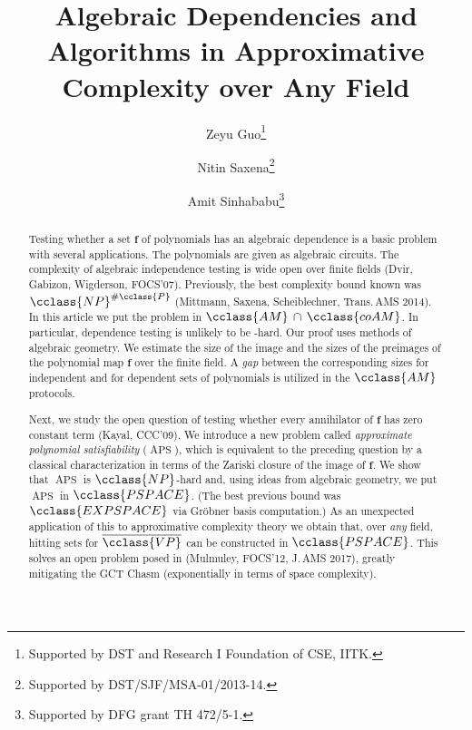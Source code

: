 \documentclass{toc}
\newcommand{\Pclass}{\cclass{P}\xspace}  %
\newcommand{\NP}{\cclass{NP}\xspace}  %
\newcommand{\AM}{\cclass{AM}\xspace}  %
\newcommand{\coAM}{\cclass{coAM}\xspace}  %
\newcommand{\AMcapcoAM}{\AM\,\cap\,\coAM}  %
\newcommand{\PSPACE}{\cclass{PSPACE}\xspace}  %
\newcommand{\EXPSPACE}{\cclass{EXPSPACE}\xspace} %
\newcommand{\VP}{\cclass{VP}\xspace}  %
\newcommand{\VPbar}{\overline{\VP}\xspace}  %
\DeclareMathOperator{\APS}{\mathrm{APS}\xspace} %
\begin{document}
\begin{frontmatter}
%
%

%
 \title{Algebraic Dependencies and \PSPACE Algorithms in Approximative Complexity over Any Field}
%
%
%
%
%
%
%
%
%
%
%
%


%
%
%
\author[guo]{Zeyu Guo\thanks{Supported by  DST and Research I Foundation of CSE, IITK.}}
\author[saxena]{Nitin Saxena\thanks{Supported by DST/SJF/MSA-01/2013-14.}}
\author[sinhababu]{Amit Sinhababu\thanks{Supported by DFG grant TH 472/5-1.}}  %

%
%
%
%

%
\begin{abstract}
  Testing whether a set $\mathbf{f}$ of polynomials has an algebraic dependence is a basic problem with several applications. The polynomials are given as algebraic circuits.
%
The complexity of algebraic independence testing  %
is wide open over finite fields (Dvir, Gabizon, Wigderson, FOCS'07).
Previously, the best complexity
bound  %
known was
%
$\NP^{\#\Pclass}$  %
(Mittmann, Saxena, Scheiblechner,
%
Trans.\,AMS 2014).  %
In this
%
article  %
we put the problem in
%
$\AMcapcoAM$.
In particular, dependence testing is unlikely to be
%
\NP-hard.  %
Our proof 
%
uses methods of algebraic geometry.  We estimate  %
%
the size of the image and the sizes of the preimages  %
of the polynomial map $\mathbf{f}$ over the finite field.
A \emph{gap} between %
the corresponding sizes  %
for independent and for dependent sets of polynomials %
%
is utilized in the $\AM$ protocols.  %

Next, we study the open question of testing whether every annihilator of $\mathbf{f}$ has zero constant term (Kayal, CCC'09). We introduce a new problem called \emph{approximate polynomial satisfiability} ($\APS$), which is equivalent to the preceding question by a classical characterization in terms of the Zariski closure of the image of $\mathbf{f}$.
We show that $\APS$ is $\NP$-hard and, using
%
ideas from algebraic geometry, %
we put $\APS$ in 
%
$\PSPACE$. %
%
(The best previous bound was
%
$\EXPSPACE$  %
via Gr\"obner basis computation.) %
As an unexpected application of this to approximative complexity theory
we obtain that,   %
over \emph{any} field, hitting sets for
%
$\VPbar$    %
can be constructed in $\PSPACE$. This solves an open problem posed in
(Mulmuley, FOCS'12, J.\,AMS 2017), %
greatly mitigating the GCT Chasm (exponentially in terms of space complexity).
\end{abstract}



\end{frontmatter}
\end{document}
